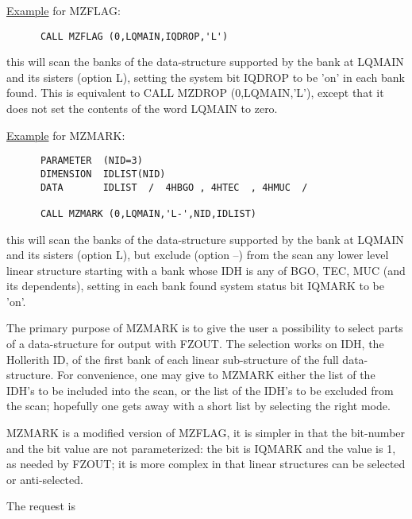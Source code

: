 \ul{Example} for MZFLAG:

\begin{verbatim}
      CALL MZFLAG (0,LQMAIN,IQDROP,'L')
\end{verbatim} 

this will scan the banks of the data-structure supported by
the bank at LQMAIN and its sisters (option L),
setting the system bit IQDROP to be 'on' in each bank found.
This is equivalent to CALL MZDROP (0,LQMAIN,'L'),
except that it does not set the contents of the word LQMAIN to zero.

\vspace*{5mm}
\ul{Example} for MZMARK:

\begin{verbatim}
      PARAMETER  (NID=3)
      DIMENSION  IDLIST(NID)
      DATA       IDLIST  /  4HBGO , 4HTEC  , 4HMUC  /

      CALL MZMARK (0,LQMAIN,'L-',NID,IDLIST)
\end{verbatim} 
this will scan the banks of the data-structure supported by
the bank at LQMAIN and its sisters (option L),
but exclude (option --) from the scan any lower level linear structure
starting with a bank whose IDH is any of BGO, TEC, MUC
(and its dependents),
setting in each bank found system status bit IQMARK to be 'on'.

The primary purpose of MZMARK is to give the user a possibility
to select parts of a data-structure for output with FZOUT.
The selection works on IDH, the Hollerith ID, of the first bank
of each linear sub-structure of the full data-structure.
For convenience,
one may give to MZMARK either the list of the IDH's to be included
into the scan, or the list of the IDH's to be excluded from the scan;
hopefully one gets away with a short list by selecting the right
mode.

MZMARK is a modified version of MZFLAG, it is simpler in that
the bit-number and the bit value are not parameterized:
the bit is IQMARK and the value is 1, as needed by FZOUT;
it is more complex in that linear structures can be selected
or anti-selected.

The request is

